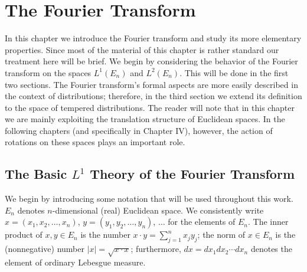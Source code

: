 \chapter{The Fourier Transform}

In this chapter we introduce the Fourier transform and study its more
elementary properties. Since most of the material of this chapter is rather
standard our treatment here will be brief. We begin by considering the behavior
of the Fourier transform on the spaces $L^{1}(E_{n})$ and $L^{2}(E_{n})$. This
will be done in the first two sections. The Fourier transform's formal aspects
are more easily described in the context of distributions; therefore, in the
third section we extend its definition to the space of tempered distributions.
The reader will note that in this chapter we are mainly exploiting the
translation structure of Euclidean spaces. In the following chapters (and
specifically in Chapter IV), however, the action of rotations on these spaces
plays an important role.

\section{The Basic \texorpdfstring{$L^{1}$}{L1} Theory of the Fourier Transform}

We begin by introducing some notation that will be used throughout this work.
$E_{n}$ denotes $n$-dimensional (real) Euclidean space. We consistently write
$x = (x_{1}, x_{2}, \ldots, x_{n})$, $y = (y_{1}, y_{2}, \ldots, y_{n})$,
$\ldots$ for the elements of $E_{n}$. The inner product of $x, y \in E_{n}$ is
the number $x \cdot y = \sum_{j=1}^{n} x_{j} y_{j}$; the norm of $x \in E_{n}$
is the (nonnegative) number $|x| = \sqrt{x \cdot x}$; furthermore,
$dx = dx_{1} dx_{2} \cdots dx_{n}$ denotes the element of ordinary Lebesgue
measure.

